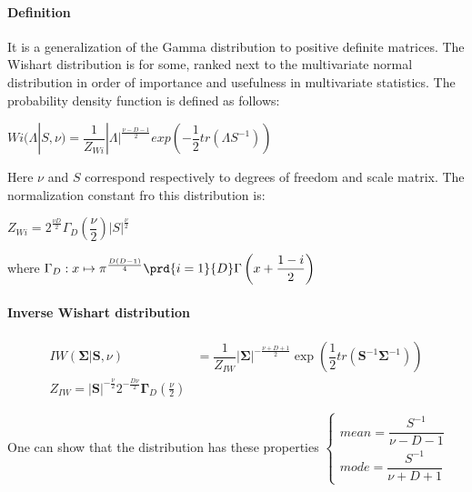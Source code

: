 \paragraph{Definition}
It is a generalization of the Gamma distribution to positive definite matrices.
The Wishart distribution is for some, ranked next to the multivariate normal distribution
in order of importance and usefulness in multivariate statistics.
The probability density function is defined as follows:
\begin{center}
    $Wi(\Lambda|S,\nu) = \dfrac{1}{Z_{Wi}}|\Lambda|^{\frac{\nu-D-1}{2}}exp\left(
    -\dfrac{1}{2}tr(\Lambda S^{-1})\right)$
\end{center}
Here $\nu$ and $S$ correspond respectively to degrees of freedom and scale matrix.
The normalization constant fro this distribution is:
\begin{center}
    $Z_{Wi} = 2^{\frac{\nu D}{2}}\Gamma_{D}\left(\dfrac{\nu}{2}\right)|S|^{\frac{\nu}{2}}$
\end{center}
where $\Gamma_{D}: x\mapsto \pi^{\frac{D(D-1)}{4}}\prd{i=1}{D}\Gamma\left(x+\dfrac{1-i}
    {2}\right)$

\paragraph{Inverse Wishart distribution}
\begin{align*}
    IW(\bm{\Sigma}|\bm{S}, \nu) &= \dfrac{1}{Z_{IW}}|\bm{\Sigma}|^{-\frac{\nu + D + 1}{2}}
    \exp\left(\dfrac{1}{2}tr(\bm{S}^{-1}\bm{\Sigma}^{-1})\right)\\
    Z_{IW} = |\bm{S}|^{-\frac{\nu}{2}}2^{-\frac{D\nu}{2}}\bm{\Gamma}_{D}\left(\frac{\nu}
        {2}\right)
\end{align*}

One can show that the distribution has these properties
$\begin{cases}
    mean = \dfrac{S^{-1}}{\nu - D - 1}\\
    mode = \dfrac{S^{-1}}{\nu + D + 1}
\end{cases}$
